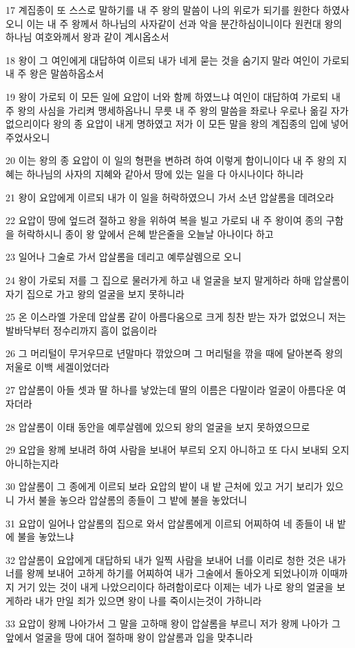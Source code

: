 \par 17 계집종이 또 스스로 말하기를 내 주 왕의 말씀이 나의 위로가 되기를 원한다 하였사오니 이는 내 주 왕께서 하나님의 사자같이 선과 악을 분간하심이니이다 원컨대 왕의 하나님 여호와께서 왕과 같이 계시옵소서
\par 18 왕이 그 여인에게 대답하여 이르되 내가 네게 묻는 것을 숨기지 말라 여인이 가로되 내 주 왕은 말씀하옵소서
\par 19 왕이 가로되 이 모든 일에 요압이 너와 함께 하였느냐 여인이 대답하여 가로되 내 주 왕의 사심을 가리켜 맹세하옵나니 무릇 내 주 왕의 말씀을 좌로나 우로나 옮길 자가 없으리이다 왕의 종 요압이 내게 명하였고 저가 이 모든 말을 왕의 계집종의 입에 넣어주었사오니
\par 20 이는 왕의 종 요압이 이 일의 형편을 변하려 하여 이렇게 함이니이다 내 주 왕의 지혜는 하나님의 사자의 지혜와 같아서 땅에 있는 일을 다 아시나이다 하니라
\par 21 왕이 요압에게 이르되 내가 이 일을 허락하였으니 가서 소년 압살롬을 데려오라
\par 22 요압이 땅에 엎드려 절하고 왕을 위하여 복을 빌고 가로되 내 주 왕이여 종의 구함을 허락하시니 종이 왕 앞에서 은혜 받은줄을 오늘날 아나이다 하고
\par 23 일어나 그술로 가서 압살롬을 데리고 예루살렘으로 오니
\par 24 왕이 가로되 저를 그 집으로 물러가게 하고 내 얼굴을 보지 말게하라 하매 압살롬이 자기 집으로 가고 왕의 얼굴을 보지 못하니라
\par 25 온 이스라엘 가운데 압살롬 같이 아름다움으로 크게 칭찬 받는 자가 없었으니 저는 발바닥부터 정수리까지 흠이 없음이라
\par 26 그 머리털이 무거우므로 년말마다 깎았으며 그 머리털을 깎을 때에 달아본즉 왕의 저울로 이백 세겔이었더라
\par 27 압살롬이 아들 셋과 딸 하나를 낳았는데 딸의 이름은 다말이라 얼굴이 아름다운 여자더라
\par 28 압살롬이 이태 동안을 예루살렘에 있으되 왕의 얼굴을 보지 못하였으므로
\par 29 요압을 왕께 보내려 하여 사람을 보내어 부르되 오지 아니하고 또 다시 보내되 오지 아니하는지라
\par 30 압살롬이 그 종에게 이르되 보라 요압의 밭이 내 밭 근처에 있고 거기 보리가 있으니 가서 불을 놓으라 압살롬의 종들이 그 밭에 불을 놓았더니
\par 31 요압이 일어나 압살롬의 집으로 와서 압살롬에게 이르되 어찌하여 네 종들이 내 밭에 불을 놓았느냐
\par 32 압살롬이 요압에게 대답하되 내가 일찍 사람을 보내어 너를 이리로 청한 것은 내가 너를 왕께 보내어 고하게 하기를 어찌하여 내가 그술에서 돌아오게 되었나이까 이때까지 거기 있는 것이 내게 나았으리이다 하려함이로다 이제는 네가 나로 왕의 얼굴을 보게하라 내가 만일 죄가 있으면 왕이 나를 죽이시는것이 가하니라
\par 33 요압이 왕께 나아가서 그 말을 고하매 왕이 압살롬을 부르니 저가 왕께 나아가 그 앞에서 얼굴을 땅에 대어 절하매 왕이 압살롬과 입을 맞추니라

